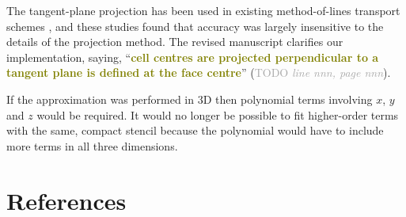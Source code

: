 \documentclass[times]{elsarticle}
\newcommand{\TODO}[1]{\textcolor{darkgray}{TODO \textit{#1}}}
\newcommand{\revthree}[1]{\textcolor{olive}{\textbf{#1}}}
\begin{document}
\begin{quotation}
\begin{comment}
Can you comment on the projection to the tangent plane for the spherical test example. 
Note that projection to another grid can change the interpolation/approximation essentially, 
like the transformation of a boundary following grid in physical space to a Cartesian grid in 
computational space. Why is the interpolation/approximation not done in 3 dimensional 
physical space.
\end{comment}
\end{quotation}
The tangent-plane projection has been used in existing method-of-lines transport schemes \citep{lashley2002,skamarock-menchaca2010,skamarock-gassmann2011}, and these studies found that accuracy was largely insensitive to the details of the projection method.  The revised manuscript clarifies our implementation, saying, ``\revthree{cell centres are projected perpendicular to a tangent plane is defined at the face centre}'' (\TODO{line nnn, page nnn}).

If the approximation was performed in 3D then polynomial terms involving $x$, $y$ and $z$ would be required.  It would no longer be possible to fit higher-order terms with the same, compact stencil because the polynomial would have to include more terms in all three dimensions.

\section*{References}


\end{document}
